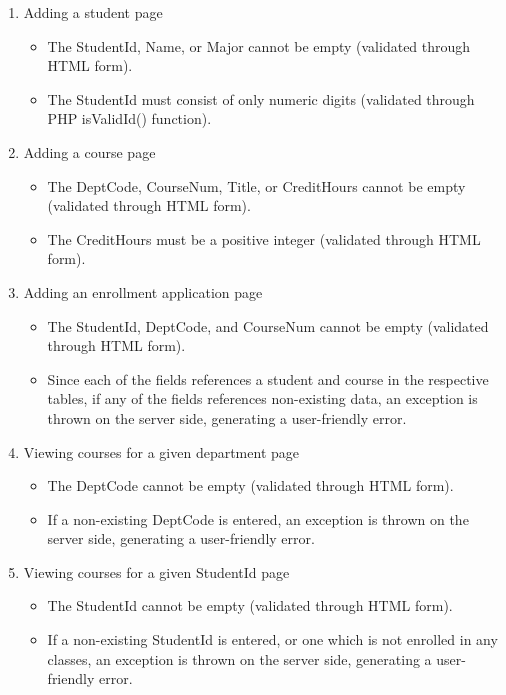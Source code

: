 \documentclass{article}      %
\begin{document}
\begin{enumerate}
\item Adding a student page
	\begin{itemize}
	\item The StudentId, Name, or Major cannot be empty (validated through HTML form).
	\item The StudentId must consist of only numeric digits
		(validated through PHP isValidId() function).
	\end{itemize}
\item Adding a course page
	\begin{itemize}
	\item The DeptCode, CourseNum, Title, or CreditHours cannot be empty
		(validated through HTML form).
	\item The CreditHours must be a positive integer (validated through HTML form).
	\end{itemize}
\item Adding an enrollment application page
	\begin{itemize}
	\item The StudentId, DeptCode, and CourseNum cannot be empty
		(validated through HTML form).
	\item Since each of the fields references a student and course in the respective
		tables, if any of the fields references non-existing data, an exception is
		thrown on the server side, generating a user-friendly error.  
	\end{itemize}
\item Viewing courses for a given department page
	\begin{itemize}
	\item The DeptCode cannot be empty (validated through HTML form).
	\item If a non-existing DeptCode is entered, an exception is thrown on the
		server side, generating a user-friendly error.
	\end{itemize}
\item Viewing courses for a given StudentId page
	\begin{itemize}
	\item The StudentId cannot be empty (validated through HTML form).
	\item If a non-existing StudentId is entered, or one which is not enrolled in any
		classes, an exception is thrown on the server side, generating a
		user-friendly error.
	\end{itemize}
\end{enumerate}
\end{document}
